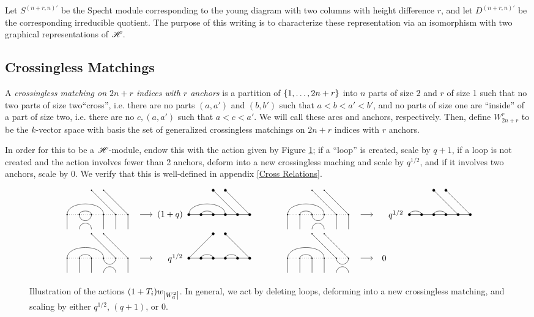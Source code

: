 \documentclass{amsart}
\begin{document}
Let $S^{(n+r,n)'}$ be the Specht module corresponding to the young diagram with two columns with height difference $r$, and let $D^{(n+r,n)'}$ be the corresponding irreducible quotient.
The purpose of this writing is to characterize these representation via an isomorphism with two graphical representations of $\mathscr{H}$.

\subsection{Crossingless Matchings}
\begin{definition}
  A \emph{crossingless matching on $2n+r$ indices with $r$ anchors} is a partition of $\left\{ 1,\dots,2n+r \right\}$ into $n$ parts of size $2$ and $r$ of size 1 such that no two parts of size two``cross'', i.e. there are no parts $(a,a')$ and $(b,b')$ such that $a < b < a' < b'$, and no parts of size one are ``inside'' of a part of size two, i.e. there are no $c, (a,a')$ such that $a < c < a'$.
  We will call these arcs and anchors, respectively.
  Then, define $W^r_{2n+r}$ to be the $k$-vector space with basis the set of generalized crossingless matchings on $2n+r$ indices with $r$ anchors.

  In order for this to be a $\mathscr{H}$-module, endow this with the action given by Figure \ref{Action}; 
  if a ``loop'' is created, scale by $q+1$, if a loop is not created and the action involves fewer than 2 anchors, deform into a new crossingless maching and scale by $q^{1/2}$, and if it involves two anchors, scale by 0.
  We verify that this is well-defined in appendix \ref{Cross Relations}.
\end{definition}

\begin{figure}[b]
  \[
    \begin{tabular}{l l}
      \GeneralizedAction{6}{1/4,2/3}{2}{5/1,6/2}{1}{2}{1/4, 2/3}{5/1,6/2}{(1+q)}
      \hspace{20pt}
      &
      \GeneralizedAction{6}{1/4,2/3}{2}{5/1,6/2}{1}{3}{1/2, 3/4}{5/1,6/2}{q^{1/2}}\\
      \GeneralizedAction{6}{1/4,2/3}{2}{5/1,6/2}{1}{4}{2/3, 4/5}{1/1,6/2}{q^{1/2}}
      &
      \GeneralizedZeroAction{6}{1/4,2/3}{2}{5/1,6/2}{1}{5}
    \end{tabular}
  \]
    
  \caption{Illustration of the actions $(1 + T_i)w_{\left| W^2_6 \right|}$.
    In general, we act by deleting loops, deforming into a new crossingless matching, and scaling by either $q^{1/2}$, $(q + 1)$, or 0.
  }
  \label{Action}
\end{figure}
\end{document}
